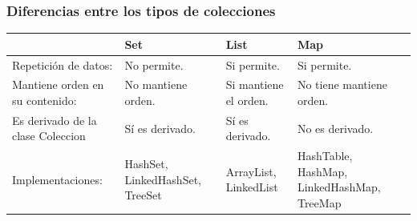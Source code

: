 \documentclass[12pt]{report}
\begin{document}
\subsubsection{Diferencias entre los tipos de colecciones}
\begin{center}
    \begin{tabular}{||p{4cm}|p{3cm}|p{3cm}|p{3cm}||}
        \hline
        &Set & List & Map \\
         \hline\hline
        Repetición de datos:&No permite.&Si permite.&Si permite.\\
         \hline
        Mantiene orden en su contenido:&No mantiene orden.&Si mantiene el orden.&No tiene mantiene orden.\\
         \hline
        Es derivado de la clase Coleccion&Sí es derivado.&Sí es derivado. &No es derivado.\\
         \hline
        Implementaciones:&HashSet, LinkedHashSet, TreeSet &ArrayList, LinkedList&HashTable, HashMap, LinkedHashMap, TreeMap\\
         \hline
        \end{tabular}
\end{center}

\end{document}
